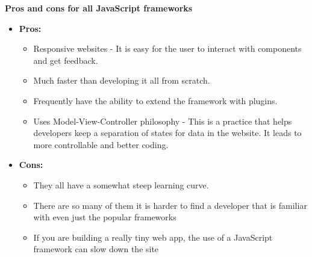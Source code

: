 \documentclass[draftclsnofoot,onecolumn,letterpaper,10pt]{IEEEtran}
\begin{document}
	\textbf{Pros and cons for all JavaScript frameworks}
		\begin{itemize}

			\item{\textbf{Pros:}}
				\begin{itemize}
					\item Responsive websites - It is easy for the user to interact with components and get feedback.
					\item Much faster than developing it all from scratch.
					\item Frequently have the ability to extend the framework with plugins.
					\item Uses Model-View-Controller philosophy - This is a practice that helps developers keep a separation of states for data in the website. It leads to more controllable and better coding.
				\end{itemize}

			\item{\textbf{Cons:}}
				\begin{itemize}
					\item They all have a somewhat steep learning curve.
					\item There are so many of them it is harder to find a developer that is familiar with even just the popular frameworks
					\item If you are building a really tiny web app, the use of a JavaScript framework  can slow down the site
				\end{itemize}

		\end{itemize}
\end{document}
